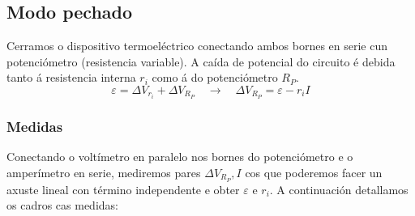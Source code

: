 \documentclass[12pt, a4paper, titlepage]{article}
\begin{document}
  \subsection{Modo pechado}

  Cerramos o dispositivo termoeléctrico conectando ambos bornes en serie cun potenciómetro (resistencia variable).
  A caída de potencial do circuito é debida tanto á resistencia interna $r_i$ como á do potenciómetro $R_P$.
  \begin{equation}
    \varepsilon = \Delta V_{r_i} + \Delta V_{R_P} \quad \rightarrow \quad \Delta V_{R_P} = \varepsilon - r_i I
  \end{equation}

  \subsubsection{Medidas}

  Conectando o voltímetro en paralelo nos bornes do potenciómetro e o amperímetro en serie, mediremos pares $\Delta V_{R_P}, I$ cos que poderemos facer un axuste lineal con término independente e obter $\varepsilon$ e $r_i$.
  A continuación detallamos os cadros cas medidas:
\end{document}
